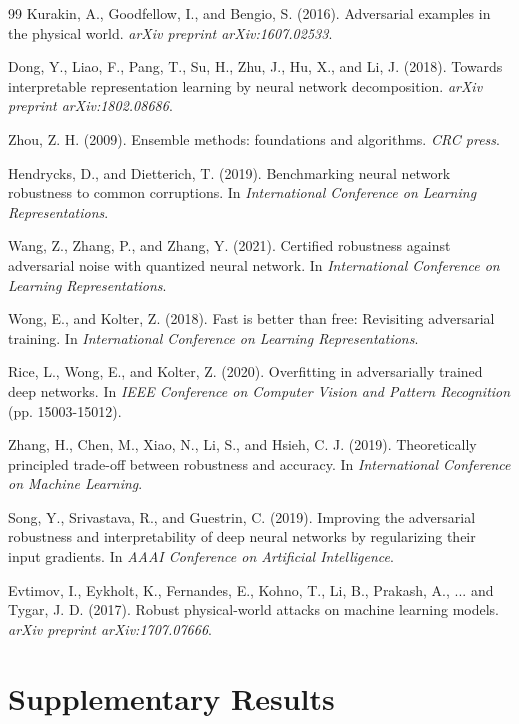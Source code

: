 \documentclass[10pt,conference]{IEEEtran}
\begin{document}
\begin{thebibliography}{99}
 Kurakin, A., Goodfellow, I., and Bengio, S. (2016). Adversarial examples in the physical world. \textit{arXiv preprint arXiv:1607.02533}.

 Dong, Y., Liao, F., Pang, T., Su, H., Zhu, J., Hu, X., and Li, J. (2018). Towards interpretable representation learning by neural network decomposition. \textit{arXiv preprint arXiv:1802.08686}.

 Zhou, Z. H. (2009). Ensemble methods: foundations and algorithms. \textit{CRC press}.

 Hendrycks, D., and Dietterich, T. (2019). Benchmarking neural network robustness to common corruptions. In \textit{International Conference on Learning Representations}.

 Wang, Z., Zhang, P., and Zhang, Y. (2021). Certified robustness against adversarial noise with quantized neural network. In \textit{International Conference on Learning Representations}.

 Wong, E., and Kolter, Z. (2018). Fast is better than free: Revisiting adversarial training. In \textit{International Conference on Learning Representations}.

 Rice, L., Wong, E., and Kolter, Z. (2020). Overfitting in adversarially trained deep networks. In \textit{IEEE Conference on Computer Vision and Pattern Recognition} (pp. 15003-15012).

 Zhang, H., Chen, M., Xiao, N., Li, S., and Hsieh, C. J. (2019). Theoretically principled trade-off between robustness and accuracy. In \textit{International Conference on Machine Learning}.

 Song, Y., Srivastava, R., and Guestrin, C. (2019). Improving the adversarial robustness and interpretability of deep neural networks by regularizing their input gradients. In \textit{AAAI Conference on Artificial Intelligence}.

 Evtimov, I., Eykholt, K., Fernandes, E., Kohno, T., Li, B., Prakash, A., ... and Tygar, J. D. (2017). Robust physical-world attacks on machine learning models. \textit{arXiv preprint arXiv:1707.07666}.

\end{thebibliography}

\appendix

\section{Supplementary Results}
\end{document}
